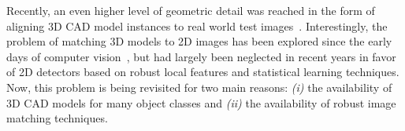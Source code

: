 Recently, an even higher level of geometric detail was reached in the
form of aligning
3D CAD model instances to real world test images~\cite{Aubry14,
  Lim14,Kholgade14, Chen13, Kostas14}. Interestingly, the problem of matching
3D models to 2D images has been explored since the early days of computer
vision~\cite{Lowe87}, but had largely been neglected in recent years
in favor of 2D detectors based on robust local features and
statistical learning techniques. Now, this problem is being revisited
for two main reasons: {\em (i)} the availability of 3D CAD models
for many object classes and {\em (ii)} the availability of robust
image matching techniques.
%
%
%
%

